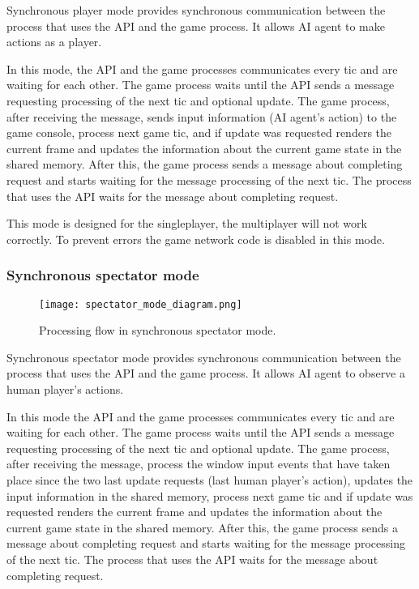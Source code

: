 	    Synchronous player mode provides synchronous communication between the process that uses the API and the game process. It allows AI agent to make actions as a player. 
	    
	    In this mode, the API and the game processes communicates every tic and are waiting for each other. The game process waits until the API sends a message requesting processing of the next tic and optional update. The game process, after receiving the message, sends input information (AI agent's action) to the game console, process next game tic, and if update was requested renders the current frame and updates the information about the current game state in the shared memory. After this, the game process sends a message about completing request and starts waiting for the message processing of the next tic. The process that uses the API waits for the message about completing request.
	    
	    This mode is designed for the singleplayer, the multiplayer will not work correctly. To prevent errors the game network code is disabled in this mode.

    \subsubsection{Synchronous spectator mode}\label{sec:architecture_spectator_mode}

	    \begin{figure}
			    \centering
			    \texttt{[image: spectator\_mode\_diagram.png]}
			    \caption{Processing flow in synchronous spectator mode.}\label{fig:spectator_mode_diagram}
	    \end{figure}
	    
	    Synchronous spectator mode provides synchronous communication between the process that uses the API and the game process. It allows AI agent to observe a human player's actions. 
	    
	    In this mode the API and the game processes communicates every tic and are waiting for each other. The game process waits until the API sends a message requesting processing of the next tic and optional update. The game process, after receiving the message, process the window input events that have taken place since the two last update requests (last human player's action), updates the input information in the shared memory, process next game tic and if update was requested renders the current frame and updates the information about the current game state in the shared memory. After this, the game process sends a message about completing request and starts waiting for the message processing of the next tic. The process that uses the API waits for the message about completing request.

